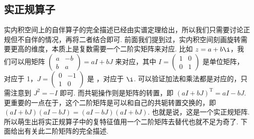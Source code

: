 





\subsection{实正规算子}

实内积空间上的自伴算子的完全描述已经由实谱定理给出，所以我们只需要讨论正规但不自伴的情况，再将二者结合即可. 前面我们提到过，实内积空间刻画旋转需要更高的维度，本质上是复数需要一个二阶实矩阵来对应. 比如 $ z = a + b\i $，我们可以用矩阵 $ \begin{pmatrix} a & -b \\ b & a \end{pmatrix} = aI + bJ $ 来对应，其中 $ I = \begin{pmatrix} 1 & 0 \\ 0 & 1 \end{pmatrix} $ 是单位矩阵，对应于 1，$ J = \begin{pmatrix} 0 & -1 \\ 1 & 0 \end{pmatrix} $ 是 ，对应于 $ \i $. 可以验证加法和乘法都是对应的，只需注意到 $ J^2 = -I $ 即可. 而共轭操作则是矩阵的转置，即 $ (aI + bJ)^{\mathrm{T}} = aI - bJ $. 更重要的一点在于，这个二阶矩阵是可以和自己的共轭转置交换的，即 $ (aI + bJ)(aI - bJ) = (aI - bJ)(aI + bJ) $. 也就是说，这是一个实正规矩阵. 所以萌生出将实正规算子中的复特征值用一个二阶矩阵去替代也就不足为奇了. 下面给出有关此二阶矩阵的完全描述.

